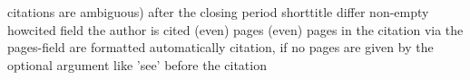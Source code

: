 citations are ambiguous)
after the closing period
shorttitle differ
non-empty howcited field
the author is cited
(even) pages
(even) pages
in the citation
via the pages-field are formatted automatically
citation, if no pages are given by the optional argument
like 'see' before the citation
%
%
